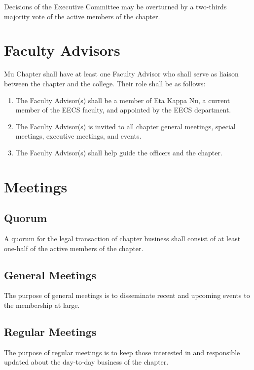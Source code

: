 \documentclass[11pt]{article}
\begin{document}
Decisions of the Executive Committee may be overturned by a two-thirds majority vote of the active members of the chapter.
\section{Faculty Advisors}
\label{sec:orgd02c70c}

Mu Chapter shall have at least one Faculty Advisor who shall serve as liaison between the chapter and the college.
Their role shall be as follows:

\begin{enumerate}
\item The Faculty Advisor(s) shall be a member of Eta Kappa Nu, a current member of the EECS faculty, and appointed by the EECS department.
\item The Faculty Advisor(s) is invited to all chapter general meetings, special meetings, executive meetings, and events.
\item The Faculty Advisor(s) shall help guide the officers and the chapter.
\end{enumerate}
\section{Meetings}
\label{sec:org75f2924}

\subsection{Quorum}
\label{sec:orgdb2e294}

A quorum for the legal transaction of chapter business shall consist of at least one-half of the active members of the chapter.

\subsection{General Meetings}
\label{sec:orgf512e06}

The purpose of general meetings is to disseminate recent and upcoming events to the membership at large.

\subsection{Regular Meetings}
\label{sec:org0dfa60e}

The purpose of regular meetings is to keep those interested in and responsible updated about the day-to-day business of the chapter.
\end{document}
